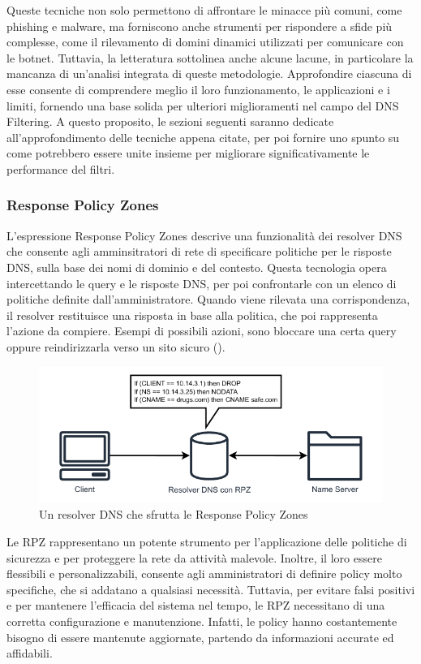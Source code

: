 Queste tecniche non solo permettono di affrontare le minacce più comuni, come phishing e malware, ma forniscono anche strumenti per rispondere a sfide più complesse, come il rilevamento di domini dinamici utilizzati per comunicare con le botnet. Tuttavia, la letteratura sottolinea anche alcune lacune, in particolare la mancanza di un'analisi integrata di queste metodologie. Approfondire ciascuna di esse consente di comprendere meglio il loro funzionamento, le applicazioni e i limiti, fornendo una base solida per ulteriori miglioramenti nel campo del DNS Filtering. A questo proposito, le sezioni seguenti saranno dedicate all'approfondimento delle tecniche appena citate, per poi fornire uno spunto su come potrebbero essere unite insieme per migliorare significativamente le performance del filtri.

\subsubsection{Response Policy Zones}
L'espressione Response Policy Zones descrive una funzionalità dei resolver DNS che consente agli amminsitratori di rete di specificare politiche per le risposte DNS, sulla base dei nomi di dominio e del contesto. Questa tecnologia opera intercettando le query e le risposte DNS, per poi confrontarle con un elenco di politiche definite dall'amministratore. Quando viene rilevata una corrispondenza, il resolver restituisce una risposta in base alla politica, che poi rappresenta l'azione da compiere. Esempi di possibili azioni, sono bloccare una certa query oppure reindirizzarla verso un sito sicuro ().

\begin{figure}
  \centering
  \includegraphics[width=1.0\linewidth]{figures/Response_Policy_zones.pdf}
  \caption{Un resolver DNS che sfrutta le Response Policy Zones}
  \label{fig:rpz}
\end{figure}

Le RPZ rappresentano un potente strumento per l'applicazione delle politiche di sicurezza e per proteggere la rete da attività malevole. Inoltre, il loro essere flessibili e personalizzabili, consente agli amministratori di definire policy molto specifiche, che si addatano a qualsiasi necessità. Tuttavia, per evitare falsi positivi e per mantenere l'efficacia del sistema nel tempo, le RPZ necessitano di una corretta configurazione e manutenzione. Infatti, le policy hanno costantemente bisogno di essere mantenute aggiornate, partendo da informazioni accurate ed affidabili.

